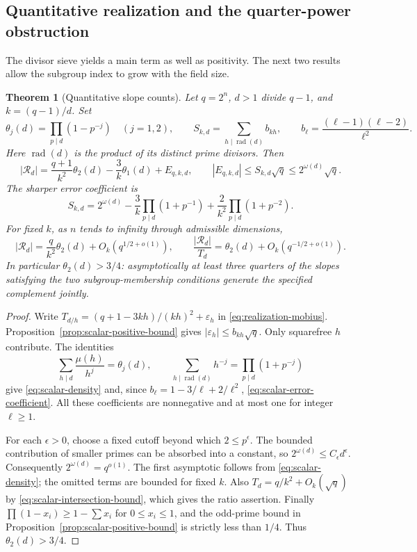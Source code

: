 \documentclass[11pt]{article}
\newtheorem{theorem}{Theorem}[section]
\begin{document}
\subsection{Quantitative realization and the quarter-power obstruction}

The divisor sieve yields a main term as well as positivity. The next
two results allow the subgroup index to grow with the field size.

\begin{theorem}[Quantitative slope counts]\label{thm:scalar-density}
Let $q=2^n$, $d>1$ divide $q-1$, and $k=(q-1)/d$. Set
\[
 \theta_j(d)=\prod_{p\mid d}(1-p^{-j})\quad(j=1,2),\qquad
 S_{k,d}=\sum_{h\mid\operatorname{rad}(d)}b_{kh},
 \qquad b_\ell=\frac{(\ell-1)(\ell-2)}{\ell^2}.
\]
Here $\operatorname{rad}(d)$ is the product of its distinct prime divisors.
Then
\begin{equation}\label{eq:scalar-density}
 |\mathcal R_d|=\frac{q+1}{k^2}\theta_2(d)
                -\frac3k\theta_1(d)+E_{q,k,d},
 \qquad |E_{q,k,d}|\le S_{k,d}\sqrt q\le2^{\omega(d)}\sqrt q.
\end{equation}
The sharper error coefficient is
\begin{equation}\label{eq:scalar-error-coefficient}
 S_{k,d}=2^{\omega(d)}-\frac3k\prod_{p\mid d}(1+p^{-1})
                    +\frac2{k^2}\prod_{p\mid d}(1+p^{-2}).
\end{equation}
For fixed $k$, as $n$ tends to infinity through admissible dimensions,
\begin{equation}\label{eq:scalar-density-asymptotic}
 |\mathcal R_d|=\frac q{k^2}\theta_2(d)+O_k(q^{1/2+o(1)}),
 \qquad
 \frac{|\mathcal R_d|}{T_d}
       =\theta_2(d)+O_k(q^{-1/2+o(1)}).
\end{equation}
In particular $\theta_2(d)>3/4$: asymptotically at least three quarters
of the slopes satisfying the two subgroup-membership conditions generate
the specified complement jointly.
\end{theorem}
\begin{proof}
Write $T_{d/h}=(q+1-3kh)/(kh)^2+\varepsilon_h$ in
\eqref{eq:realization-mobius}. Proposition~\ref{prop:scalar-positive-bound}
gives $|\varepsilon_h|\le b_{kh}\sqrt q$. Only squarefree $h$ contribute.
The identities
\[
 \sum_{h\mid d}\frac{\mu(h)}{h^j}=\theta_j(d),\qquad
 \sum_{h\mid\operatorname{rad}(d)}h^{-j}
       =\prod_{p\mid d}(1+p^{-j})
\]
give \eqref{eq:scalar-density} and, since $b_\ell=1-3/\ell+2/\ell^2$,
\eqref{eq:scalar-error-coefficient}. All these coefficients are
nonnegative and at most one for integer $\ell\ge1$.

For each $\epsilon>0$, choose a fixed cutoff beyond which $2\le p^\epsilon$.
The bounded contribution of smaller primes can be absorbed into a constant,
so $2^{\omega(d)}\le C_\epsilon d^\epsilon$. Consequently
$2^{\omega(d)}=q^{o(1)}$. The first asymptotic follows from
\eqref{eq:scalar-density}; the omitted terms are bounded for fixed $k$.
Also $T_d=q/k^2+O_k(\sqrt q)$ by
\eqref{eq:scalar-intersection-bound}, which gives the ratio assertion.
Finally $\prod(1-x_i)\ge1-\sum x_i$ for $0\le x_i\le1$, and the
odd-prime bound in Proposition~\ref{prop:scalar-positive-bound} is
strictly less than $1/4$. Thus $\theta_2(d)>3/4$.
\end{proof}
\end{document}
